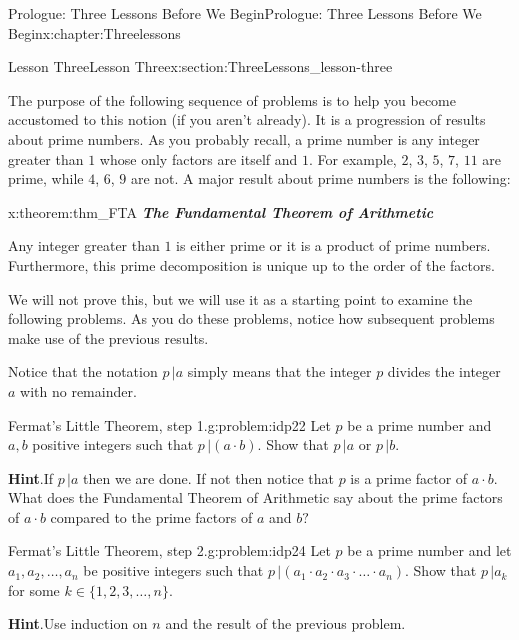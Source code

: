 \documentclass[oneside,10pt,]{book}
\newcommand{\blocktitlefont}{\relax}
\newcommand{\alert}[1]{\textbf{\textit{#1}}}
\numberwithin{equation}{section}
\begin{document}
\begin{chapterptx}{Prologue: Three Lessons Before We Begin}{}{Prologue: Three Lessons Before We Begin}{}{}{x:chapter:Threelessons}
\begin{sectionptx}{Lesson Three}{}{Lesson Three}{}{}{x:section:ThreeLessons_lesson-three}
\par
The purpose of the following sequence of problems is to help you become accustomed to this notion (if you aren't already). It is a progression of results about prime numbers. As you probably recall, a prime number is any integer greater than \(1\) whose only factors are itself and \(1\). For example, \(2\), \(3\), \(5\), \(7\), \(11\) are prime, while \(4\), \(6\), \(9\) are not. A major result about prime numbers is the following:%
\begin{theorem}{}{}{x:theorem:thm_FTA}%
\alert{The Fundamental Theorem of Arithmetic}%
\par
Any integer greater than \(1\) is either prime or it is a product of prime numbers. Furthermore, this prime decomposition is unique up to the order of the factors.%
\end{theorem}
We will not prove this, but we will use it as a starting point to examine the following problems. As you do these problems, notice how subsequent problems make use of the previous results.%
\par
Notice that the notation \(p\,|a\) simply means that the integer \(p\) divides the integer \(a\) with no remainder.%
\begin{problem}{Fermat's Little Theorem, step 1.}{g:problem:idp22}%
 Let \(p\) be a prime number and \(a, b\) positive integers such that \(p\, | (a\cdot b)\). Show that \(p\,|a\) or \(p\,|b\).%
\par\smallskip%
\noindent\textbf{\blocktitlefont Hint}.\hypertarget{g:hint:idp23}{}\quad{}If \(p\,|a\) then we are done. If not then notice that \(p\) is a prime factor of \(a\cdot b\). What does the Fundamental Theorem of Arithmetic say about the prime factors of \(a\cdot b\) compared to the prime factors of \(a\) and \(b?\)%
\end{problem}
\begin{problem}{Fermat's Little Theorem, step 2.}{g:problem:idp24}%
 Let \(p\) be a prime number and let \(a_1, a_2, \ldots,
a_n\) be positive integers such that \(p\,|\left(a_1\cdot
a_2\cdot a_3\cdot\ldots\cdot a_n\right)\).  Show that \(p\,|a_k\) for some \(k\in\{1, 2, 3, \ldots, n\}\).%
\par\smallskip%
\noindent\textbf{\blocktitlefont Hint}.\hypertarget{g:hint:idp25}{}\quad{}Use induction on \(n\) and the result of the previous problem.%

\end{problem}
\end{sectionptx}
\end{chapterptx}
\end{document}
